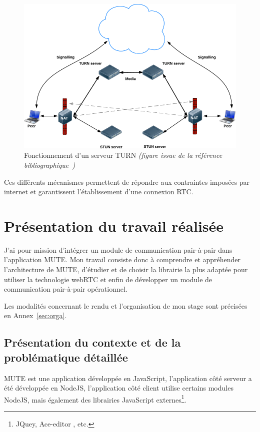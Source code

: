 \documentclass{tnreport}
\begin{document}
\begin{figure}[!h]
  \centering
  \includegraphics[width=14cm]{figures/turn}
  \caption{Fonctionnement d'un serveur TURN \emph{(figure issue de la référence bibliographique~\cite{GettingStartedwithWebRTC})}}
  \label{fig:turn}
\end{figure}

Ces différents mécanismes permettent de répondre aux contraintes imposées par internet et garantissent l'établissement d'une connexion RTC. 

\cleardoublepage

\chapter{Présentation du travail réalisée}

J'ai pour mission d'intégrer un module de communication pair-à-pair dans l'application MUTE. Mon travail consiste donc à comprendre et appréhender l'architecture de MUTE, d'étudier et de choisir la librairie la plus adaptée pour utiliser la technologie webRTC et enfin de développer un module de communication pair-à-pair opérationnel.

Les modalités concernant le rendu et l'organisation de mon stage sont précisées en Annex~\ref{sec:orga}.

\section{Présentation du contexte et de la problématique détaillée}

MUTE est une application développée en JavaScript, l'application côté serveur a été développée en NodeJS, l'application côté client utilise certains modules NodeJS, mais également des librairies JavaScript externes\footnote{JQuey, Ace-editor , etc.}.
\end{document}
